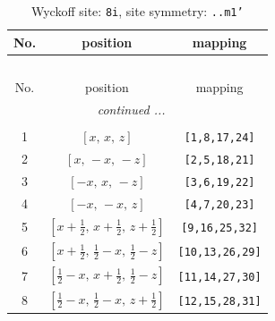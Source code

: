 \documentclass[fleqn,8pt]{jsarticle}
\begin{document}
\begin{longtable}{ccc}
\caption{Wyckoff site: {\tt 8i}, site symmetry: {\tt ..m1'}}
 \\
 \hline \hline
No. & position & mapping \\ \hline \endfirsthead

\multicolumn{2}{l}{\tablename\ \thetable{}} \\
 \hline \hline
No. & position & mapping \\ \hline \endhead

 \hline \hline
\multicolumn{2}{r}{\footnotesize\it continued ...} \\ \endfoot

 \hline \hline
\multicolumn{2}{r}{} \\ \endlastfoot

1 & $\left[ x,\, x,\, z \right]$ & {\tt [1,8,17,24]} \\ \hline
2 & $\left[ x,\, - x,\, - z \right]$ & {\tt [2,5,18,21]} \\ \hline
3 & $\left[ - x,\, x,\, - z \right]$ & {\tt [3,6,19,22]} \\ \hline
4 & $\left[ - x,\, - x,\, z \right]$ & {\tt [4,7,20,23]} \\ \hline
5 & $\left[ x + \frac{1}{2},\, x + \frac{1}{2},\, z + \frac{1}{2} \right]$ & {\tt [9,16,25,32]} \\ \hline
6 & $\left[ x + \frac{1}{2},\, \frac{1}{2} - x,\, \frac{1}{2} - z \right]$ & {\tt [10,13,26,29]} \\ \hline
7 & $\left[ \frac{1}{2} - x,\, x + \frac{1}{2},\, \frac{1}{2} - z \right]$ & {\tt [11,14,27,30]} \\ \hline
8 & $\left[ \frac{1}{2} - x,\, \frac{1}{2} - x,\, z + \frac{1}{2} \right]$ & {\tt [12,15,28,31]} \\
\end{longtable}
\renewcommand{\arraystretch}{1.2}
\end{document}
